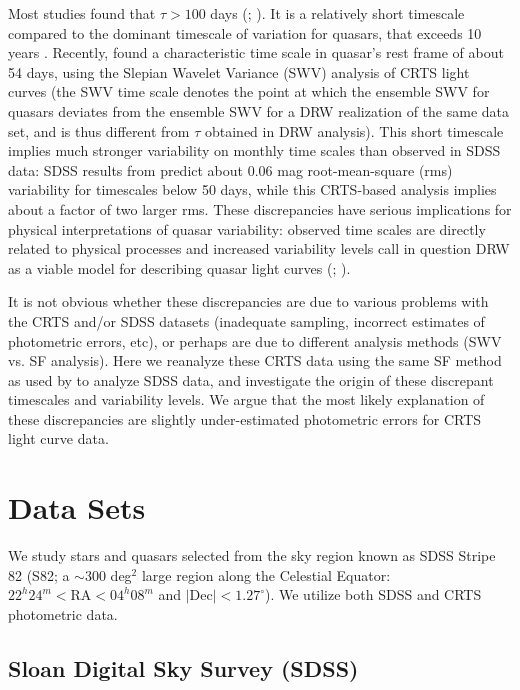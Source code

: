 \documentclass[fleqn,usenatbib]{mnras}
\begin{document}
Most studies found that $\tau > 100$ days (\citealt{macleod2010};  \citealt{kozlowski2016}). It is a relatively short timescale compared to the dominant timescale of variation for quasars, that exceeds 10 years \citep{hawkins2007}. Recently, \cite{graham2014} 
found a characteristic time scale in quasar's rest frame of about 54 days, using the Slepian Wavelet Variance (SWV) analysis
of CRTS light curves (the SWV time scale denotes the point at which the ensemble SWV for quasars deviates from
the ensemble SWV for a DRW  realization of the same data set, and is thus different from $\tau$ obtained in DRW analysis). 
This short timescale implies much stronger variability on monthly time scales than observed in SDSS 
data: SDSS results from \cite{macleod2010} predict about 0.06 mag root-mean-square (rms) variability for timescales below 
50 days, while this CRTS-based analysis implies about a factor of two larger rms. These discrepancies have serious
implications for physical interpretations of quasar variability: observed time scales are directly related to physical processes
and increased variability levels call in question DRW as a viable model for describing quasar light curves 
(\citealt{macleod2010};  \citealt{kozlowski2016}). 

It is not obvious whether these discrepancies are due to various problems with the CRTS and/or SDSS datasets
(inadequate sampling, incorrect estimates of photometric errors, etc), or perhaps are due to different analysis 
methods (SWV vs. SF analysis). Here we reanalyze these CRTS data using the same SF method as used by
\cite{macleod2010} to analyze SDSS data, and investigate the origin of these discrepant timescales and 
variability levels. We argue that the most likely explanation of these discrepancies are slightly under-estimated
photometric errors for CRTS light curve data. 


\section{Data Sets}

We study stars and quasars selected from the sky region known as SDSS Stripe 82 (S82; a $\sim$300 deg$^2$ large
region along the Celestial Equator: $22^{h} 24^{m} < \mathrm{RA} < 04^{h} 08^{m}$ and $\mathrm{| Dec |} < 1.27^\circ$). 
We utilize both SDSS and CRTS photometric data. 

\subsection{Sloan Digital Sky Survey (SDSS)}
\end{document}
